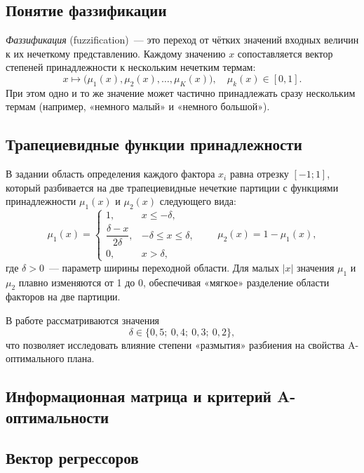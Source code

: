 \documentclass[a4paper,12pt]{article}
\begin{document}
\subsection{Понятие фаззификации}

\emph{Фаззификация} (fuzzification)~--- это переход от чётких значений
входных величин к их нечеткому представлению.
Каждому значению $x$ сопоставляется вектор степеней принадлежности
к нескольким нечетким термам:
\begin{equation}
x \mapsto \bigl( \mu_1(x), \mu_2(x), \dots, \mu_K(x) \bigr),\quad
\mu_k(x) \in [0,1].
\end{equation}
При этом одно и то же значение может частично принадлежать сразу
нескольким термам (например, «немного малый» и «немного большой»).

\subsection{Трапециевидные функции принадлежности}

В задании область определения каждого фактора $x_i$
равна отрезку $[-1;1]$, который разбивается на две трапециевидные
нечеткие партиции с функциями принадлежности
$\mu_1(x)$ и $\mu_2(x)$ следующего вида:
\begin{equation}
\mu_1(x) =
\begin{cases}
1, & x \le -\delta, \\
\dfrac{\delta - x}{2\delta}, & -\delta \le x \le \delta, \\
0, & x > \delta,
\end{cases}
\qquad
\mu_2(x) = 1 - \mu_1(x),
\end{equation}
где $\delta>0$~--- параметр ширины переходной области.
Для малых $|x|$ значения $\mu_1$ и $\mu_2$
плавно изменяются от 1 до 0, обеспечивая «мягкое»
разделение области факторов на две партиции.

В работе рассматриваются значения
\[
\delta \in \{0{,}5;\ 0{,}4;\ 0{,}3;\ 0{,}2\},
\]
что позволяет исследовать влияние степени «размытия» разбиения
на свойства A-оптимального плана.

\subsection{Информационная матрица и критерий A-оптимальности}

\subsection{Вектор регрессоров}
\end{document}
